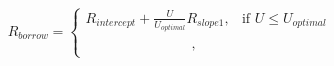 \documentclass[preview]{standalone}
\begin{document}
\begin{align*}
R_{borrow} = \begin{cases} R_{intercept} + \frac{ U }{ U _{optimal}}R_{slope1}, & \text{if }  U  \leq  U _{optimal} \\[6pt] \phantom{R_{intercept} + R_{slope2}}, & \phantom{\text{if }  U  >  U _{optimal}} \end{cases}
\end{align*}
\end{document}
